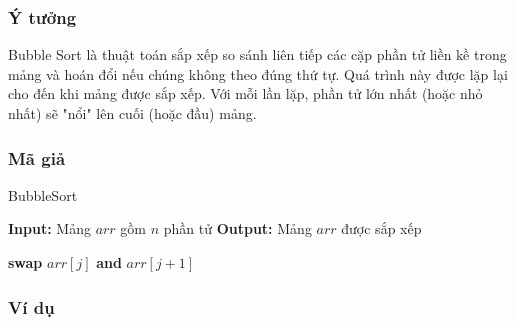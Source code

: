 \subsubsection{Ý tưởng}
Bubble Sort là thuật toán sắp xếp so sánh liên tiếp các cặp phần tử liền kề trong mảng và hoán đổi nếu chúng không theo đúng thứ tự. Quá trình này được lặp lại cho đến khi mảng được sắp xếp. Với mỗi lần lặp, phần tử lớn nhất (hoặc nhỏ nhất) sẽ "nổi" lên cuối (hoặc đầu) mảng.
\subsubsection{Mã giả}

\begin{algorithm}[H]
\caption{BubbleSort}
\begin{algorithmic}[1]
    \State \textbf{Input:} Mảng $arr$ gồm $n$ phần tử
    \State \textbf{Output:} Mảng $arr$ được sắp xếp
    
                \State \textbf{swap} $arr[j]$ \textbf{and} $arr[j+1]$
            \EndIf
        \EndFor
    \EndFor
\EndProcedure
\end{algorithmic}
\end{algorithm}

\subsubsection{Ví dụ}

